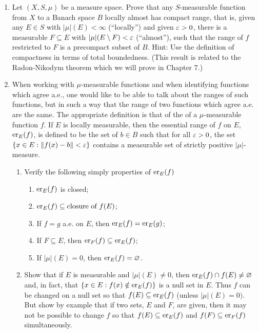 \begin{enumerate}[label=\arabic*),ref=\arabic*]
\item Let $(X,S,\mu)$ be a measure space. Prove that any $S$-measurable function from $X$ to a Banach space $B$ locally almost has compact range, that is, given any $E\in S$ with $|\mu|(E)<\infty$ (``locally'') and given $\ep>0$, there is a measurable $F\subseteq E$ with $|\mu|(E\sd F)<\ep$ (``almost''), such that the range of $f$ restricted to $F$ is a precompact subset of $B$. Hint: Use the definition of compactness in terms of total boundedness. (This result is related to the Radon-Nikodym theorem which we will prove in Chapter 7.) %

\item\label{exer:essential range}
When working with $\mu$-measurable functions and when identifying functions which agree a.e., one would like to be able to talk about the ranges of such functions, but in such a way that the range of two functions which agree a.e. are the same. The appropriate definition is that of the  of a $\mu$-measurable function $f$. If $E$ is locally measurable, then the essential range of $f$ on $E$, $\er{f}{E}$, is defined to be the set of $b \in B$ such that for all $\ep>0$, the set $\brc{x\in E:\norm{f(x)-b}<\ep}$ contains a measurable set of strictly positive $|\mu|$-measure. %
\begin{enumerate}
    \item Verify the following simply properties of $\er{f}{E}$
    \begin{enumerate}[label=\arabic*)]
        \item $\er{f}{E}$ is closed;
        \item $\er{f}{E}\subseteq\text{closure of }f(E)$;
        \item If $f=g$ a.e. on $E$, then $\er{f}{E}=\er{g}{E}$;
        \item If $F\subseteq E$, then $\er{f}{F}\subseteq\er{f}{E}$;
        \item If $|\mu|(E)=0$, then $\er{f}{E}=\varnothing$.
    \end{enumerate}
    
    \item Show that if $E$ is measurable and $|\mu|(E)\neq 0$, then $\er{f}{E}\cap f(E)\neq\varnothing$ and, in fact, that $\brc{x \in E: f(x)\notin\er{f}{E}}$ is a null set in $E$. Thus $f$ can be changed on a null set so that $f(E) \subseteq\er{f}{E}$ (unless $|\mu|(E)=0)$. But show by example that if two sets, $E$ and $F$, are given, then it may not be possible to change $f$ so that $f(E)\subseteq\er{f}{E}$ and $f(F)\subseteq\er{f}{F}$ simultaneously.
    

\end{enumerate}
\end{enumerate}
